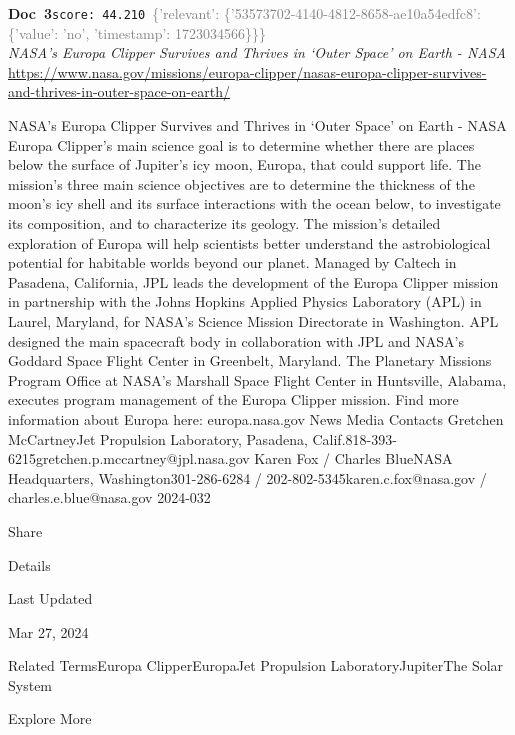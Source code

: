 \documentclass[a4paper,11pt]{article}
\begin{document}
\begin{docenv}
{\footnotesize\textcolor{doccolor}{\textbf{Doc~3}}}\hfill{\tiny\texttt{score:~44.210}}\ {\tiny\textcolor{gray}{\{'relevant': \{'53573702-4140-4812-8658-ae10a54edfc8': \{'value': 'no', 'timestamp': 1723034566\}\}\}}}\\[3pt]
{\small\textit{NASA’s Europa Clipper Survives and Thrives in ‘Outer Space’ on Earth - NASA}}\\[2pt]
{\tiny\url{https://www.nasa.gov/missions/europa-clipper/nasas-europa-clipper-survives-and-thrives-in-outer-space-on-earth/}}\\[4pt]
{\footnotesize NASA’s Europa Clipper Survives and Thrives in ‘Outer Space’ on Earth - NASA
Europa Clipper’s main science goal is to determine whether there are places below the surface of Jupiter’s icy moon, Europa, that could support life. The mission’s three main science objectives are to determine the thickness of the moon’s icy shell and its surface interactions with the ocean below, to investigate its composition, and to characterize its geology. The mission’s detailed exploration of Europa will help scientists better understand the astrobiological potential for habitable worlds beyond our planet.
Managed by Caltech in Pasadena, California, JPL leads the development of the Europa Clipper mission in partnership with the Johns Hopkins Applied Physics Laboratory (APL) in Laurel, Maryland, for NASA’s Science Mission Directorate in Washington. APL designed the main spacecraft body in collaboration with JPL and NASA’s Goddard Space Flight Center in Greenbelt, Maryland. The Planetary Missions Program Office at NASA’s Marshall Space Flight Center in Huntsville, Alabama, executes program management of the Europa Clipper mission.
Find more information about Europa here:
europa.nasa.gov
News Media Contacts
Gretchen McCartneyJet Propulsion Laboratory, Pasadena, Calif.818-393-6215gretchen.p.mccartney@jpl.nasa.gov
Karen Fox / Charles BlueNASA Headquarters, Washington301-286-6284 / 202-802-5345karen.c.fox@nasa.gov / charles.e.blue@nasa.gov
2024-032

Share

Details

Last Updated

Mar 27, 2024

Related TermsEuropa ClipperEuropaJet Propulsion LaboratoryJupiterThe Solar System

 

Explore More

 

}
\end{docenv}
\end{document}
